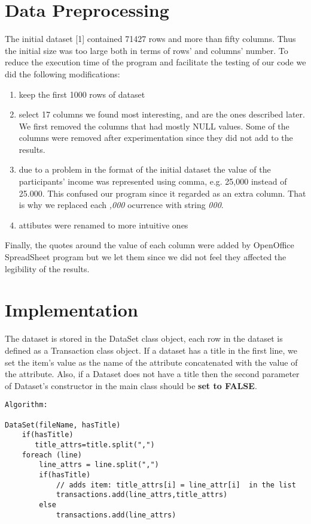 \documentclass[11pt]{article}
\begin{document}
\section{Data Preprocessing}

The initial dataset [1] contained 71427 rows and more than fifty columns. Thus the initial size was too large both in terms of rows' and columns' number. To reduce the execution time of the program and facilitate the testing of our code we did the following modifications:
\begin{enumerate}
   \item keep the first 1000 rows of dataset
   \item select 17 columns we found most interesting, and are the ones described later. We first removed the columns that had mostly NULL values. Some of the columns were removed after      experimentation since they did not add to the results.
   \item due to a problem in the format of the initial dataset the value of the participants' income was represented using comma, e.g. 25,000 instead of 25.000. This confused our program since it regarded as an extra column. That is why we replaced each  \textit{,000} ocurrence with string  \textit{000}.
   \item attibutes were renamed to more intuitive ones
\end{enumerate}
Finally, the quotes around the value of each column were added by OpenOffice SpreadSheet program but we let them since we did not feel they affected the legibility of the results.

\section{Implementation}

The dataset is stored in the DataSet class object, each row in the dataset is defined as a Transaction class object. If a dataset has a title in the first line, we set the item's value as the name of the attribute concatenated with the value of the attribute. Also, if a Dataset does not have a title then the second parameter of Dataset's constructor in the main class should be \textbf{set to FALSE}.

\begin{verbatim}
Algorithm:

DataSet(fileName, hasTitle)
    if(hasTitle)
       title_attrs=title.split(",")
    foreach (line)
        line_attrs = line.split(",")
        if(hasTitle)
            // adds item: title_attrs[i] = line_attr[i]  in the list
            transactions.add(line_attrs,title_attrs)
        else
            transactions.add(line_attrs)
\end{verbatim}
\end{document}
